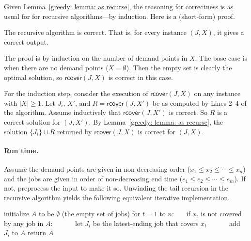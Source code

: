 Given Lemma~\ref{greedy: lemma: as recurse},
the reasoning for correctness is as usual for for recursive algorithms---by induction.  Here is a (short-form) proof.

\begin{theorem}
  The recursive algorithm is correct.  That is, for every instance $(J, X)$, it gives a correct output.
\end{theorem}
\begin{shortFormProof}
  The proof is by induction on the number of demand points in $X$.
  The base case is when there are no demand points ($X=\emptyset$).
  Then the empty set is clearly the optimal solution,
  so $\textsf{rcover}(J,X)$ is correct in this case.

  For the induction step, consider the execution of $\textsf{rcover}(J, X)$ on any instance with $|X|\ge 1$.
  Let $J_i$, $X'$, and $R=\textsf{rcover}(J, X')$ be as computed by Lines 2--4 of the algorithm.
  Assume inductively that $\textsf{rcover}(J, X')$ is correct.
  So $R$ is a correct solution for $(J, X')$.
  By Lemma~\ref{greedy: lemma: as recurse},
  the solution $\{J_i\} \cup R$ returned by $\textsf{rcover}(J, X)$ is correct for $(J, X)$.
\end{shortFormProof}

\paragraph{Run time.}
Assume the demand points are given in non-decreasing order
($x_1 \le x_2 \le \cdots \le x_n$)
and the jobs are given in order of non-decreasing end time
($e_1 \le e_2 \le \cdots \le e_m$).
If not, preprocess the input to make it so.
Unwinding the tail recursion in the recursive algorithm
yields the following equivalent iterative implementation.

\begin{myframed}
  \begin{steps}
  \item[{{\sf icover}$(J=(J_1, J_2, \ldots, J_m), X=(x_1, x_2, \ldots, x_n))$:}]
    \step initialize $A$ to be $\emptyset$ (the empty set of jobs)
    \step for $t = 1$ to $n$:
    \step~~~if $x_t$ is not covered by any job in $A$:
    \step~~~~~~let $J_i$ be the latest-ending job that covers $x_t$
    \step~~~~~~add $J_i$ to $A$
    \step return $A$
  \end{steps}
\end{myframed}

